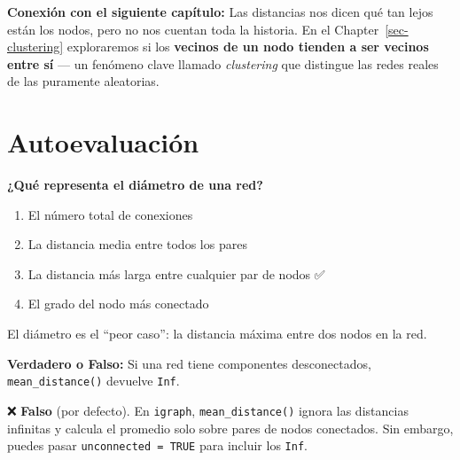 \documentclass[
  letterpaper,
  DIV=11,
  numbers=noendperiod]{scrreprt}
\providecommand{\tightlist}{%
  \setlength{\itemsep}{0pt}\setlength{\parskip}{0pt}}
\begin{document}
\textbf{Conexión con el siguiente capítulo:} Las distancias nos dicen
qué tan lejos están los nodos, pero no nos cuentan toda la historia. En
el Chapter~\ref{sec-clustering} exploraremos si los \textbf{vecinos de
un nodo tienden a ser vecinos entre sí} --- un fenómeno clave llamado
\emph{clustering} que distingue las redes reales de las puramente
aleatorias.

\section*{Autoevaluación}\label{autoevaluaciuxf3n-2}


\begin{tcolorbox}[enhanced jigsaw, toprule=.15mm, colframe=quarto-callout-caution-color-frame, coltitle=black, titlerule=0mm, colback=white, breakable, leftrule=.75mm, arc=.35mm, bottomtitle=1mm, toptitle=1mm, rightrule=.15mm, bottomrule=.15mm, left=2mm, title=\textcolor{quarto-callout-caution-color}{\faFire}\hspace{0.5em}{Pregunta 1}, colbacktitle=quarto-callout-caution-color!10!white, opacityback=0, opacitybacktitle=0.6]

\textbf{¿Qué representa el diámetro de una red?}

\begin{enumerate}
\def\labelenumi{\alph{enumi})}
\tightlist
\item
  El número total de conexiones
\item
  La distancia media entre todos los pares
\item
  La distancia más larga entre cualquier par de nodos ✅
\item
  El grado del nodo más conectado
\end{enumerate}

El diámetro es el ``peor caso'': la distancia máxima entre dos nodos en
la red.

\end{tcolorbox}

\begin{tcolorbox}[enhanced jigsaw, toprule=.15mm, colframe=quarto-callout-caution-color-frame, coltitle=black, titlerule=0mm, colback=white, breakable, leftrule=.75mm, arc=.35mm, bottomtitle=1mm, toptitle=1mm, rightrule=.15mm, bottomrule=.15mm, left=2mm, title=\textcolor{quarto-callout-caution-color}{\faFire}\hspace{0.5em}{Pregunta 2}, colbacktitle=quarto-callout-caution-color!10!white, opacityback=0, opacitybacktitle=0.6]

\textbf{Verdadero o Falso:} Si una red tiene componentes desconectados,
\texttt{mean\_distance()} devuelve \texttt{Inf}.

❌ \textbf{Falso} (por defecto). En \texttt{igraph},
\texttt{mean\_distance()} ignora las distancias infinitas y calcula el
promedio solo sobre pares de nodos conectados. Sin embargo, puedes pasar
\texttt{unconnected\ =\ TRUE} para incluir los \texttt{Inf}.

\end{tcolorbox}
\end{document}
